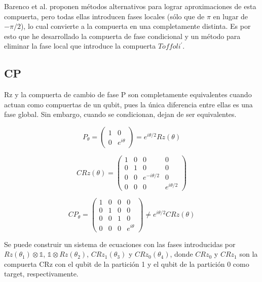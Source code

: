 Barenco et al. proponen métodos alternativos para lograr aproximaciones de esta compuerta, pero todas ellas introducen fases locales (sólo que de $\pi$ en lugar de $-\pi/2$), lo cual convierte a la compuerta en una completamente distinta. Es por esto que he desarrollado la compuerta de fase condicional y un método para eliminar la fase local que introduce la compuerta $Toffoli^\prime$.

\subsection{CP}

Rz y la compuerta de cambio de fase P son completamente equivalentes cuando actuan como compuertas de un qubit, pues la única diferencia entre ellas es una fase global. Sin embargo, cuando se condicionan, dejan de ser equivalentes.

\begin{equation}
    P_\theta = 
    \begin{pmatrix}
        1 & 0 \\
        0 & e^{i \theta}
    \end{pmatrix} = 
    e^{i \theta/2} Rz(\theta)
\end{equation}

\begin{equation}
    CRz(\theta) = 
    \begin{pmatrix}
        1 & 0 & 0 & 0 \\
        0 & 1 & 0 & 0 \\
        0 & 0 & e^{-i \theta/2} & 0 \\
        0 & 0 & 0 & e^{i \theta/2}
    \end{pmatrix}
\end{equation}

\begin{equation}
    CP_\theta = 
    \begin{pmatrix}
        1 & 0 & 0 & 0 \\
        0 & 1 & 0 & 0 \\
        0 & 0 & 1 & 0 \\
        0 & 0 & 0 & e^{i \theta}
    \end{pmatrix} \neq
    e^{i \theta/2} CRz(\theta)
\end{equation}

Se puede construir un sistema de ecuaciones con las fases introducidas por $Rz(\theta_1) \otimes \mathds{1}$, $\mathds{1} \otimes Rz(\theta_2)$, $CRz_1(\theta_3)$ y $CRz_0(\theta_4)$, donde $CRz_0$ y $CRz_1$ son la compuerta CRz con el qubit de la partición 1 y el qubit de la partición 0 como target, respectivamente.

